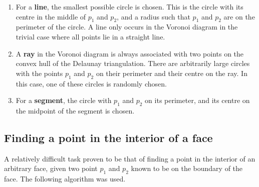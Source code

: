 \documentclass[a4paper,12pt]{article}
\begin{document}
\begin{enumerate}
\item
For a {\bf line}, the smallest possible circle is chosen. This is the circle with its centre in the middle of $p_1$ and $p_2$, and a radius such that $p_1$ and $p_2$ are on the perimeter of the circle. A line only occurs in the Voronoi diagram in the trivial case where all points lie in a straight line.
\item
A {\bf ray} in the Voronoi diagram is always associated with two points on the convex hull of the Delaunay triangulation. There are arbitrarily large circles with the points $p_1$ and $p_2$ on their perimeter and their centre on the ray. In this case, one of these circles is randomly chosen.
\item
For a {\bf segment}, the circle with $p_1$ and $p_2$ on its perimeter, and its centre on the midpoint of the segment is chosen.
\end{enumerate}

\subsection{Finding a point in the interior of a face}
\label{sec:findPoints}
A relatively difficult task proven to be that of finding a point in the interior of an arbitrary face, given two point $p_1$ and $p_2$ known to be on the boundary of the face. The following algorithm was used.
\end{document}
